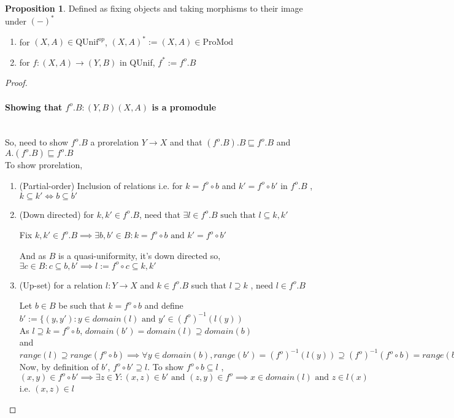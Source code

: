 \documentclass[18pt,a4paper]{article}
\makeatletter
\theoremstyle{definition}
\newtheorem{proop}{Proposition}[section]
\newcommand{\carrow}{}%
\DeclareRobustCommand{\carrow}{%
	\mathrel{\vphantom{\rightarrow}\mathpalette\circle@arrow\relax}%
}
\newcommand{\circle@arrow}[2]{%
	\m@th
	\ooalign{%
		\hidewidth$#1\circ\mkern1mu$\hidewidth\cr
	$#1\longrightarrow$\cr}%
}
\makeatother
\begin{document}
	\begin{proop}
		Defined as fixing objects and taking morphisms to their image under $(-)^*$
		\begin{enumerate}[label=(\alph*)]
			\item for $(X,A) \in \text{QUnif}^{op}$, $(X,A)^*:=(X,A) \in \text{ProMod}$
			\item for $f:(X,A) \to (Y,B)$ in QUnif,
				$f^* := f^o .B$
		\end{enumerate}
	\end{proop}
	\begin{proof}
	\item \paragraph{Showing that $f^o .B: (Y,B) \carrow (X,A)$ is a promodule } \mbox{} \\
		So, need to show $f^o .B$ a prorelation $Y \to X$
		and that $(f^o .B).B \sqsubseteq f^o .B$ and $A.(f^o .B) \sqsubseteq f^o .B$ \\
		To show prorelation, \begin{enumerate}[label=(\roman*)]
			\item (Partial-order) Inclusion of relations i.e. for $k=f^o \circ b$ and
				$k'=f^o \circ b'$ in $f^o .B$ , $k \subseteq k' \iff b \subseteq b'$
			\item (Down directed) for $k,k' \in f^o .B$, need that $\exists l \in f^o .B
				\text{ such that } l \subseteq k,k'$

				Fix $k,k' \in f^o .B \implies \exists b,b' \in B : k=f^o \circ b \text{ and }
				k' = f^o \circ b'$

				And as $B$ is a quasi-uniformity, it's down directed so,
				$\exists c \in B: c \subseteq b,b' \implies l:= f^o \circ c \subseteq k,k'$
			\item (Up-set) for a relation $l:Y \to X$ and $k \in f^o .B$ such that $l \supseteq k$
				, need $l \in f^o .B$

				Let $b\in B$ be such that $k=f^o \circ b$ and define
				$b':=\{(y,y'): y \in domain(l) \text{ and } y' \in (f^o)^{-1}(l(y))$\\
					As $l\supseteq k=f^o \circ b$, $domain(b')=domain(l)\supseteq domain(b)$
					\\ and $range(l) \supseteq range(f^o \circ b)\implies
					\forall y \in domain(b), range (b')=(f^o )^{-1}(l(y)) \supseteq (f^o)^{-1}(f^o \circ b ) = range(b)$\\
					Now, by definition of $b'$, $f^o \circ b' \supseteq l$. To show
					$f^o \circ b \subseteq l$ , \\
					$(x,y)\in f^o \circ b' \implies \exists z \in Y: (x,z)\in b' \text{ and }
					(z,y) \in f^o \implies x \in domain(l) \text{ and } z \in l(x)$ i.e.
					$(x,z) \in l$


\end{enumerate}
\end{proof}
\end{document}
